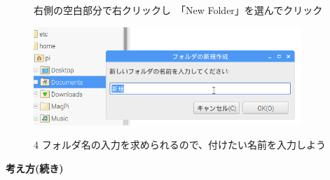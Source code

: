 \documentclass[a4paper,12pt]{jarticle}
\begin{document}
\begin{figure}[ht]
  \begin{minipage}{15.758cm}
    右側の空白部分で右クリックし　「New Folder」を選んでクリック
  \end{minipage}
  \begin{minipage}{\textwidth}
    \includegraphics[width=0.9\textwidth]{textbook-img036.png}
  \end{minipage}
  \begin{minipage}{12.336cm}
    4
    フォルダ名の入力を求められるので、付けたい名前を入力しよう
  \end{minipage}
\end{figure}
\clearpage
{\bf\large 考え方(続き)}
\end{document}
